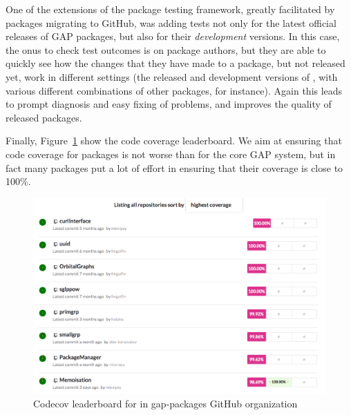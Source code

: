 One of the extensions of the package testing framework, greatly 
facilitated by packages migrating to GitHub, was adding tests not
only for the latest official releases of GAP packages, but also
for their \emph{development} versions.
In this case, the onus to check test outcomes is on package authors,
but they are able to quickly see how the changes that they have made to
a package, but not released yet, work in different settings (the
released and development versions of \GAP, with various different
combinations of other packages, for instance). Again this leads to
prompt diagnosis and easy fixing of problems, and improves the quality
of released packages.



Finally, Figure~\ref{fig:gap-packages-codecov} show the code coverage
leaderboard. We aim at ensuring that code coverage for packages is 
not worse than for the core GAP system, but in fact many packages
put a lot of effort in ensuring that their coverage is close to 100\%. 

\begin{figure}[!ht]
    \begin{mdframed}
    \centering
    \includegraphics[width=\textwidth]{images/gap-packages-codecov}
    \end{mdframed}
    \caption{Codecov leaderboard for in gap-packages GitHub organization}
    \label{fig:gap-packages-codecov}
\end{figure}

